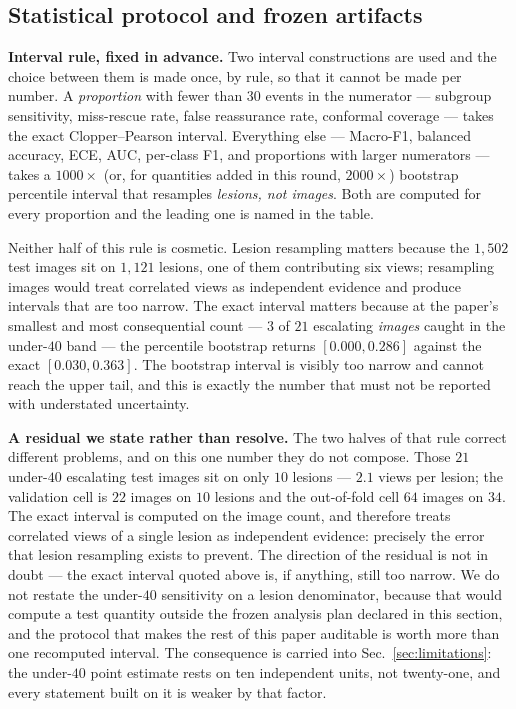 \documentclass[journal]{IEEEtran}
\begin{document}
\subsection{Statistical protocol and frozen artifacts}
\label{sec:frozen}
\textbf{Interval rule, fixed in advance.} Two interval constructions are used and the choice
between them is made once, by rule, so that it cannot be made per number. A \emph{proportion}
with fewer than $30$ events in the numerator --- subgroup sensitivity, miss-rescue rate,
false reassurance rate, conformal coverage --- takes the exact Clopper--Pearson interval.
Everything else --- Macro-F1, balanced accuracy, ECE, AUC, per-class F1, and proportions with
larger numerators --- takes a $1000\times$ (or, for quantities added in this round,
$2000\times$) bootstrap percentile interval that resamples \emph{lesions, not images}. Both
are computed for every proportion and the leading one is named in the table.

Neither half of this rule is cosmetic. Lesion resampling matters because the $1{,}502$ test
images sit on $1{,}121$ lesions, one of them contributing six views; resampling images would
treat correlated views as independent evidence and produce intervals that are too narrow. The
exact interval matters because at the paper's smallest and most consequential count --- $3$
of $21$ escalating \emph{images} caught in the under-$40$ band --- the percentile bootstrap
returns $[0.000, 0.286]$ against the exact $[0.030, 0.363]$. The bootstrap interval is
visibly too narrow and cannot reach the upper tail, and this is exactly the number that must
not be reported with understated uncertainty.

\textbf{A residual we state rather than resolve.} The two halves of that rule correct
different problems, and on this one number they do not compose. Those $21$ under-$40$
escalating test images sit on only $10$ lesions --- $2.1$ views per lesion; the validation
cell is $22$ images on $10$ lesions and the out-of-fold cell $64$ images on $34$. The exact
interval is computed on the image count, and therefore treats correlated views of a single
lesion as independent evidence: precisely the error that lesion resampling exists to prevent.
The direction of the residual is not in doubt --- the exact interval quoted above is, if
anything, still too narrow. We do not restate the under-$40$ sensitivity on a lesion
denominator, because that would compute a test quantity outside the frozen analysis plan
declared in this section, and the protocol that makes the rest of this paper auditable is
worth more than one recomputed interval. The consequence is carried into
Sec.~\ref{sec:limitations}: the under-$40$ point estimate rests on ten independent units, not
twenty-one, and every statement built on it is weaker by that factor.
\end{document}
